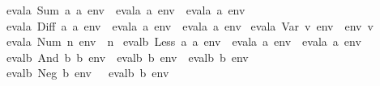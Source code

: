\begin{isabellebody}
{}evala\ {}Sum\ a{}\ a{}{}\ env\ {}\ evala\ a{}\ env\ {}\ evala\ a{}\ env{}\ {}\isanewline
{}evala\ {}Diff\ a{}\ a{}{}\ env\ {}\ evala\ a{}\ env\ {}\ evala\ a{}\ env{}\ {}\isanewline
{}evala\ {}Var\ v{}\ env\ {}\ env\ v{}\ {}\isanewline
{}evala\ {}Num\ n{}\ env\ {}\ n{}\ {}\isanewline
\isanewline
{}evalb\ {}Less\ a{}\ a{}{}\ env\ {}\ {}evala\ a{}\ env\ {}\ evala\ a{}\ env{}{}\ {}\isanewline
{}evalb\ {}And\ b{}\ b{}{}\ env\ {}\ {}evalb\ b{}\ env\ {}\ evalb\ b{}\ env{}{}\ {}\isanewline
{}evalb\ {}Neg\ b{}\ env\ {}\ {}{}\ evalb\ b\ env{}{}%
\begin{isamarkuptext}%
\noindent


\end{isamarkuptext}
\end{isabellebody}
